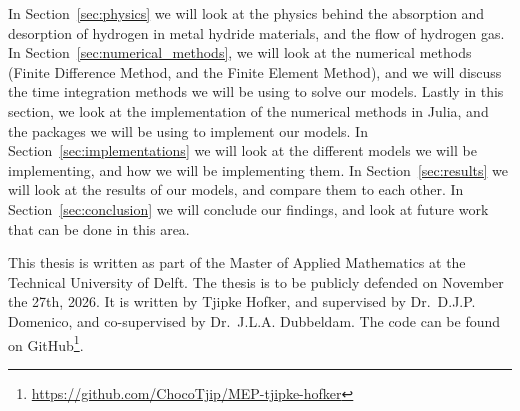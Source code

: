 In Section~\ref{sec:physics} we will look at the physics behind the absorption and desorption of hydrogen in metal hydride materials, and the flow of hydrogen gas. In Section~\ref{sec:numerical_methods}, we will look at the numerical methods (Finite Difference Method, and the Finite Element Method), and we will discuss the time integration methods we will be using to solve our models. Lastly in this section, we look at the implementation of the numerical methods in Julia, and the packages we will be using to implement our models. In Section~\ref{sec:implementations} we will look at the different models we will be implementing, and how we will be implementing them. In Section~\ref{sec:results} we will look at the results of our models, and compare them to each other. In Section~\ref{sec:conclusion} we will conclude our findings, and look at future work that can be done in this area.

\vspace{.4cm}

This thesis is written as part of the Master of Applied Mathematics at the Technical University of Delft. The thesis is to be publicly defended on November the 27th, 2026. It is written by Tjipke Hofker, and supervised by Dr.~D.J.P. Domenico, and co-supervised by Dr.~J.L.A. Dubbeldam. The code can be found on GitHub\footnote{\url{https://github.com/ChocoTjip/MEP-tjipke-hofker}}.
